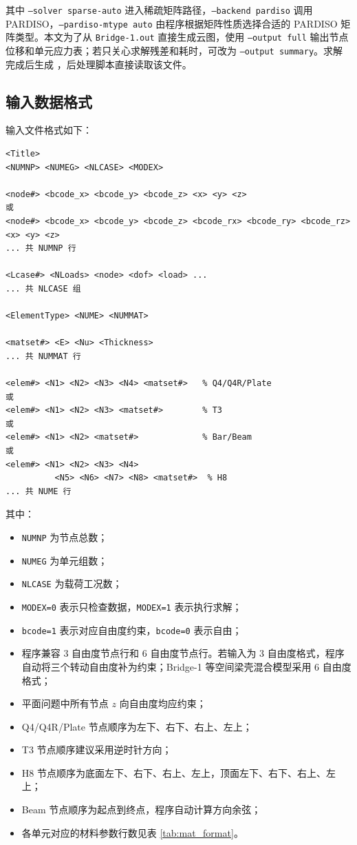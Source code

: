 \documentclass[UTF8,a4paper,zihao=-4]{ctexart}
\begin{document}
其中 \texttt{--solver sparse-auto} 进入稀疏矩阵路径，\texttt{--backend pardiso} 调用 PARDISO，\texttt{--pardiso-mtype auto} 由程序根据矩阵性质选择合适的 PARDISO 矩阵类型。本文为了从 \texttt{Bridge-1.out} 直接生成云图，使用 \texttt{--output full} 输出节点位移和单元应力表；若只关心求解残差和耗时，可改为 \texttt{--output summary}。求解完成后生成 ，后处理脚本直接读取该文件。

\subsection{输入数据格式}

输入文件格式如下：
\begin{lstlisting}[caption={STAP++ 输入文件基本格式}]
<Title>
<NUMNP> <NUMEG> <NLCASE> <MODEX>

<node#> <bcode_x> <bcode_y> <bcode_z> <x> <y> <z>
或
<node#> <bcode_x> <bcode_y> <bcode_z> <bcode_rx> <bcode_ry> <bcode_rz> <x> <y> <z>
... 共 NUMNP 行

<Lcase#> <NLoads> <node> <dof> <load> ...
... 共 NLCASE 组

<ElementType> <NUME> <NUMMAT>

<matset#> <E> <Nu> <Thickness>
... 共 NUMMAT 行

<elem#> <N1> <N2> <N3> <N4> <matset#>   % Q4/Q4R/Plate
或
<elem#> <N1> <N2> <N3> <matset#>        % T3
或
<elem#> <N1> <N2> <matset#>             % Bar/Beam
或
<elem#> <N1> <N2> <N3> <N4>
          <N5> <N6> <N7> <N8> <matset#>  % H8
... 共 NUME 行
\end{lstlisting}

其中：
\begin{itemize}
    \item \texttt{NUMNP} 为节点总数；
    \item \texttt{NUMEG} 为单元组数；
    \item \texttt{NLCASE} 为载荷工况数；
    \item \texttt{MODEX=0} 表示只检查数据，\texttt{MODEX=1} 表示执行求解；
    \item \texttt{bcode=1} 表示对应自由度约束，\texttt{bcode=0} 表示自由；
    \item 程序兼容 3 自由度节点行和 6 自由度节点行。若输入为 3 自由度格式，程序自动将三个转动自由度补为约束；Bridge-1 等空间梁壳混合模型采用 6 自由度格式；
    \item 平面问题中所有节点 $z$ 向自由度均应约束；
    \item Q4/Q4R/Plate 节点顺序为左下、右下、右上、左上；
    \item T3 节点顺序建议采用逆时针方向；
    \item H8 节点顺序为底面左下、右下、右上、左上，顶面左下、右下、右上、左上；
    \item Beam 节点顺序为起点到终点，程序自动计算方向余弦；
    \item 各单元对应的材料参数行数见表 \ref{tab:mat_format}。
\end{itemize}
\end{document}
